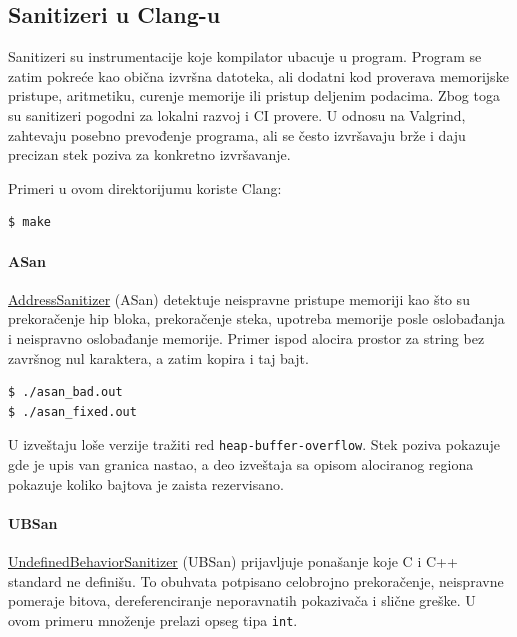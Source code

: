 \subsection{Sanitizeri u Clang-u}\label{clang-sanitizeri}

Sanitizeri su instrumentacije koje kompilator ubacuje u program. Program se zatim pokreće kao obična izvršna datoteka, ali dodatni kod proverava memorijske pristupe, aritmetiku, curenje memorije ili pristup deljenim podacima. Zbog toga su sanitizeri pogodni za lokalni razvoj i CI provere. U odnosu na Valgrind, zahtevaju posebno prevođenje programa, ali se često izvršavaju brže i daju precizan stek poziva za konkretno izvršavanje.

Primeri u ovom direktorijumu koriste Clang:

\begin{verbatim}
$ make
\end{verbatim}

\paragraph{ASan}\label{addresssanitizer}

\href{https://clang.llvm.org/docs/AddressSanitizer.html}{AddressSanitizer} (ASan) detektuje neispravne pristupe memoriji kao što su prekoračenje hip bloka, prekoračenje steka, upotreba memorije posle oslobađanja i neispravno oslobađanje memorije. Primer ispod alocira prostor za string bez završnog nul karaktera, a zatim kopira i taj bajt.



\begin{verbatim}
$ ./asan_bad.out
$ ./asan_fixed.out
\end{verbatim}

U izveštaju loše verzije tražiti red \texttt{heap-buffer-overflow}. Stek poziva pokazuje gde je upis van granica nastao, a deo izveštaja sa opisom alociranog regiona pokazuje koliko bajtova je zaista rezervisano.

\paragraph{UBSan}\label{undefinedbehaviorsanitizer}

\href{https://clang.llvm.org/docs/UndefinedBehaviorSanitizer.html}{UndefinedBehaviorSanitizer} (UBSan) prijavljuje ponašanje koje C i C++ standard ne definišu. To obuhvata potpisano celobrojno prekoračenje, neispravne pomeraje bitova, dereferenciranje neporavnatih pokazivača i slične greške. U ovom primeru množenje prelazi opseg tipa \texttt{int}.

